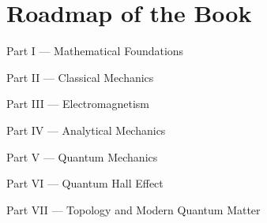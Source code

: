\chapter*{Roadmap of the Book}

Part I --- Mathematical Foundations

Part II --- Classical Mechanics

Part III --- Electromagnetism

Part IV --- Analytical Mechanics

Part V --- Quantum Mechanics

Part VI --- Quantum Hall Effect

Part VII --- Topology and Modern Quantum Matter

\cleardoublepage
	
	
	
\mainmatter
